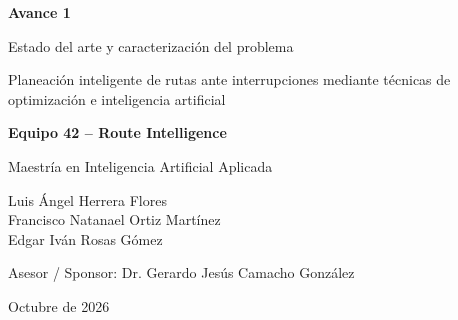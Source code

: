 \documentclass[11pt]{article}
\begin{document}
\begin{titlepage}
    \centering

    \vspace*{2.0cm}

    {\large\bfseries
    Avance 1
    \par}

    \vspace{0.6cm}

    {\LARGE\bfseries
    \parbox{0.88\textwidth}{
        \centering
        Estado del arte y caracterización del problema
    }
    \par}

    \vspace{1.2cm}

    {\large
    \parbox{0.88\textwidth}{
        \centering
        Planeación inteligente de rutas ante interrupciones mediante técnicas de optimización e inteligencia artificial
    }
    \par}

    \vspace{1.5cm}

    {\large\bfseries
    Equipo 42 -- Route Intelligence
    \par}

    \vspace{0.35cm}

    {\normalsize
    Maestría en Inteligencia Artificial Aplicada
    \par}

    \vspace{1.5cm}

    {\normalsize
    Luis Ángel Herrera Flores\\[0.25cm]
    Francisco Natanael Ortiz Martínez\\[0.25cm]
    Edgar Iván Rosas Gómez
    \par}

    \vspace{1.2cm}

    {\normalsize
    Asesor / Sponsor: Dr. Gerardo Jesús Camacho González
    \par}

    \vfill

    {\normalsize
    Octubre de 2026
    \par}

\end{titlepage}
\end{document}

